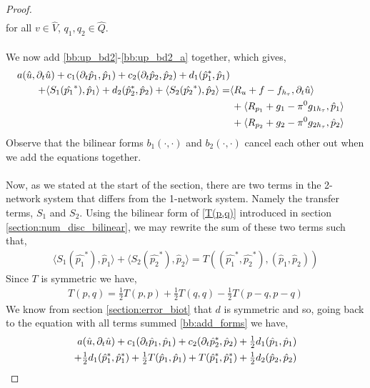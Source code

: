 \begin{proof}
\begin{align}
\end{align}
for all $v \in \hat{V}$, $q_1, q_2 \in \hat{Q}$.
\\
\\
We now add \eqref{bb:up_bd2}-\eqref{bb:up_bd2_a} together, which gives,
\begin{align}  \label{bb:add_forms}
a(\hat{u}, \partial_t \hat{u}) + c_1(\partial_t \hat{p}_1, \hat{p}_1) + c_2(\partial_t \hat{p}_2, \hat{p}_2) + d_1(\hat{p}^*_1, \hat{p}_1) \\
+ \langle S_1(\hat{p_1}^*), \hat{p}_1 \rangle + d_2(\hat{p}^*_2, \hat{p}_2) + \langle S_2(\hat{p_2}^*), \hat{p}_2 \rangle
= & \langle R_u + f - f_{h_\tau}, \partial_t \hat{u} \rangle \notag\\
& \, + \langle R_{p_1} + g_1 - \pi^0g_{1h_\tau}, \hat{p}_1 \rangle \notag \\
& \, + \langle R_{p_2} + g_2 - \pi^0g_{2h_\tau}, \hat{p}_2 \rangle \notag
\end{align}
Observe that the bilinear forms $b_1(\cdot, \cdot)$ and $b_2(\cdot, \cdot)$ cancel each other out when we add the equations together.
\\
\\
Now, as we stated at the start of the section, there are two terms in the 2-network system that differs from the 1-network system. Namely the transfer terms, $S_1$ and $S_2$. Using the bilinear form of \eqref{T(p,q)} introduced in section \ref{section:num_disc_bilinear}, we may rewrite the sum of these two terms such that, 
\begin{align}
\langle S_1(\hat{p_1}^*), \hat{p}_1 \rangle + \langle S_2(\hat{p_2}^*), \hat{p}_2 \rangle = T((\hat{p_1}^*, \hat{p_2}^*), (\hat{p}_1, \hat{p}_2))
\end{align}
Since $T$ is symmetric we have, 
\begin{align}
T(p,q) = \tfrac{1}{2}T(p,p) + \tfrac{1}{2}T(q,q) - \tfrac{1}{2}T(p-q,p-q)
\end{align}
We know from section \ref{section:error_biot} that $d$ is symmetric and so, going back to the equation with all terms summed \eqref{bb:add_forms} we have,
\begin{align}  \label{bb:add_forms}
a(\hat{u}, \partial_t \hat{u}) + c_1(\partial_t \hat{p}_1, \hat{p}_1) + c_2(\partial_t \hat{p}^*_2, \hat{p}_2) + \tfrac{1}{2}d_1(\hat{p}_1, \hat{p}_1) \\
+ \tfrac{1}{2}d_1(\hat{p}^*_1, \hat{p}^*_1) + \tfrac{1}{2}T(\hat{p}_1, \hat{p}_1) + T(\hat{p}^*_1, \hat{p}^*_1) + \tfrac{1}{2}d_2(\hat{p}_2, \hat{p}_2) \notag\\  

\end{align}
\end{proof}
